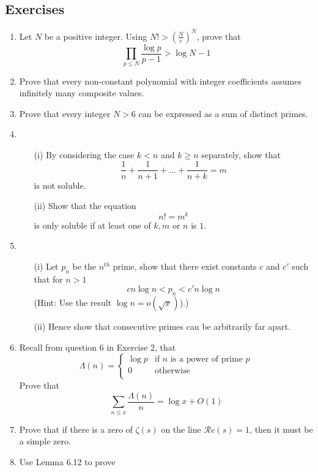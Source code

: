 \subsection{Exercises}
\begin{enumerate}
\item Let $N$ be a positive integer. Using $N! >(\frac{N}{e})^{N}$, prove that
$$\prod_{p \le N}\frac{\log{p}}{p-1} > \log{N}-1$$
\item Prove that every non-constant polynomial with integer coefficients assumes infinitely many composite values.
\item Prove that every integer $N>6$ can be expressed as a sum of distinct primes.
\item \begin{enumerate}
      \item[(i)] By considering the case $k<n$ and $k \ge n$ separately, show that
$$\frac{1}{n}+\frac{1}{n+1}+\ldots+\frac{1}{n+k}=m$$ is not soluble.
      \item[(ii)]Show that the equation
      $$n!=m^k$$
      is only soluble if at least one of $k,m$ or $n$ is $1$.
      \end{enumerate}
\item \begin{enumerate}
      \item[(i)] Let $p_n$ be the $n^{th}$ prime, show that there exist constants $c$ and $c'$ such that
      for $n>1$
      $$cn \log{n} < p_n < c'n \log{n}$$
      (Hint: Use the result $\log{n}=o(\sqrt{x})$).)
      \item[(ii)] Hence show that consecutive primes can be arbitrarily far apart.
      \end{enumerate}
\item Recall from question 6 in Exercise 2, that
\begin{equation*}
\Lambda(n)= \left\{
\begin{array}{ll}
\log{p} & \text{if } n \text{ is a power of prime } p\\
0 & \text{otherwise } \\
\end{array} \right.
\end{equation*}
Prove that
$$\sum_{n \le x}\frac{\Lambda(n)}{n}=\log{x}+O(1)$$
\item Prove that if there is a zero of $\zeta(s)$ on the line $\mathcal{R}e(s)=1$, then
      it must be a simple zero.
\item Use Lemma 6.12 to prove
      \begin{enumerate}

\end{enumerate}
\end{enumerate}

